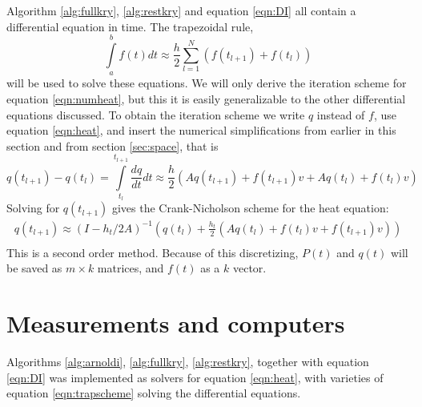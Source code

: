 Algorithm \ref{alg:fullkry}, \ref{alg:restkry} and equation \ref{eqn:DI} all contain a differential equation in time.
The trapezoidal rule\cite{trap}, 
\begin{equation} \label{eqn:trap}
\int \limits_a^b f(t) dt \approx \frac{h}{2} \sum \limits_{l = 1}^N(f(t_{l+1})+f(t_l))
\end{equation}
will be used to solve these equations. 
We will only derive the iteration scheme for equation \eqref{eqn:numheat}, but 
this it is easily generalizable to the other differential equations discussed.
To obtain the iteration scheme we write $q$ instead of $f$, use equation \eqref{eqn:heat}, and insert the numerical simplifications from earlier in this section and from section \ref{sec:space}, that is
\begin{equation}
q(t_{l+1}) - q(t_l) = \int \limits_{t_l}^{t_{l+1}} \frac{d q}{d t} dt \approx \frac{h}{2}(A q(t_{l+1})+f(t_{l+1})v +A q(t_l)+f(t_l) v) 
\end{equation}
Solving for $q(t_{l+1})$ gives the Crank-Nicholson scheme for the heat equation:
\begin{equation} \label{eqn:trapscheme}
\begin{aligned}
q(t_{l+1}) \approx (I-h_t/2 A)^{-1}(q(t_l) + \frac{h_t}{2}( A q(t_{l}) + f(t_l)v+f(t_{l+1})v))\\
\end{aligned}
\end{equation} 
This is a second order method.
Because of this discretizing, $P(t)$ and $q(t)$ will be saved as $m \times k $ matrices, and $f(t)$ as a $k$ vector.

\section{Measurements and computers} \label{sec:not}
Algorithms \ref{alg:arnoldi}, \ref{alg:fullkry}, \ref{alg:restkry}, together with equation \ref{eqn:DI} was implemented as solvers for equation \ref{eqn:heat}, with varieties of equation \ref{eqn:trapscheme} solving the differential equations. 

